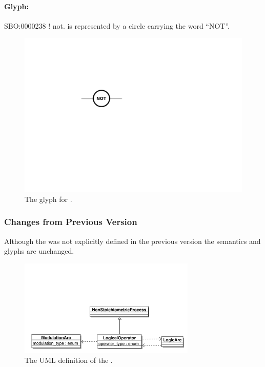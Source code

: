 \paragraph{Glyph: }\label{sec:techref:not}

\begin{glyphDescription}
 \glyphSboTerm SBO:0000238 ! not.
 \glyphNode {} is represented by a circle carrying the word ``NOT''.
 \end{glyphDescription}

\begin{figure}[htb]
  \centering
  \includegraphics[scale = 0.5]{images/not}
  \caption{The \PD glyph for .}
  \label{fig:techref:not}
\end{figure}

\subsubsection{Changes from Previous Version}

Although the  was not explicitly defined in
the previous version the semantics and glyphs are unchanged.








\label{sec:techref:relation}
\label{defn:RelationalOperator}

\begin{figure}[htb]
  \centering
  \includegraphics[width = 0.75\textwidth]{images/logicaloperatoruml}
  \caption{The UML definition of the .}
  \label{fig:techref:logicaloperatoruml}
\end{figure}


